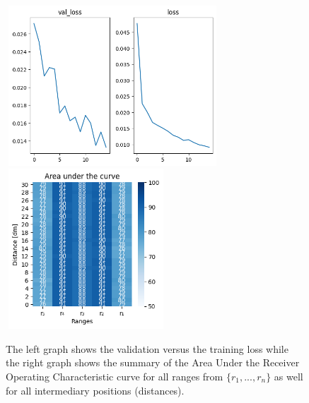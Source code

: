 \begin{multicols}{2}
\end{multicols}\begin{figure}[H]%
\centering
\includegraphics[width=8cm,height=6cm]{3_models/models_13/graph_13.png}
\hspace{0.2 cm}
\includegraphics[width=6cm,height=6cm]{4_plots/plots_13/AUC_13.png}
\caption{The left graph shows the validation versus the training loss while the right graph shows the summary of the Area Under the Receiver Operating Characteristic curve for all ranges from $\{r_{1}, ... ,r_{n}\}$ as well for all intermediary positions (distances).}
\label{auc_13}
\end{figure}


\newpage
